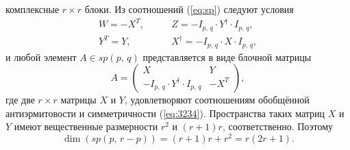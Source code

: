 \documentclass[a4paper,12pt]{article}
\begin{document}
комплексные $r \times r$ блоки. Из соотношений (\ref{eq:sp}) следуют условия
 \begin{align}
	 W = - X^T,&\qquad Z=-I_{p,\,q} \cdot Y^\dag \cdot I_{p,\,q},\\
	 Y^T = Y,&\qquad X^\dag = - I_{p,\,q} \cdot X \cdot I_{p,\,q},
	 \label{eq:3234}
\end{align}
и любой элемент $A \in sp(p,\,q)$ представляется в виде блочной матрицы
\begin{equation}
	A= \begin{pmatrix} 
	X & Y \\ -I_{p,\,q} \cdot Y^\dag \cdot I_{p,\,q} & - X^T \end{pmatrix} 
,\end{equation}
где две $r \times r$ матрицы $X$ и $Y$, удовлетворяют соотношениям обобщённой
антиэрмитовости и симметричности (\ref{eq:3234}). Пространства
таких матриц $X $ и $Y$  имеют вещественные размерности $r^2$ и $(r+1)r$,
соответственно. Поэтому
\begin{equation}
	\dim (sp(p,\,r-p))=(r+1)r + r^2= r(2r +1)
	\label{eq:3236}
.\end{equation}
\end{document}
